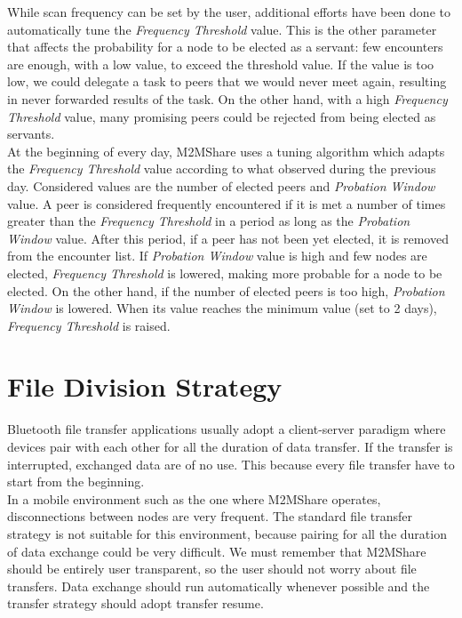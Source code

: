 While scan frequency can be set by the user, additional efforts have been done to automatically tune the \textit{Frequency Threshold} value. This is the other parameter that affects the probability  for a node to be elected as a servant: few encounters are enough, with a low value, to exceed the threshold value. If the value is too low, we could delegate a task to peers that we would never meet again, resulting in never forwarded results of the task. On the other hand, with a high \textit{Frequency Threshold} value, many promising peers could be rejected from being elected as servants.
\\

At the beginning of every day, M2MShare uses a tuning algorithm which adapts the \textit{Frequency Threshold} value according to what observed during the previous day. Considered values are the number of elected peers and \textit{Probation Window} value. A peer is considered frequently encountered if it is met a number of times greater than the \textit{Frequency Threshold} in a period as long as the \textit{Probation Window} value. After this period, if a peer has not been yet elected, it is removed from the encounter list. If \textit{Probation Window} value is high and few nodes are elected, \textit{Frequency Threshold} is lowered, making more probable for a node to be elected. On the other hand, if the number of elected peers is too high, \textit{Probation Window} is lowered. When its value reaches the minimum value (set to 2 days), \textit{Frequency Threshold} is raised.


\section{File Division Strategy}
\label{descrFileDivisionStrategy}
Bluetooth file transfer applications usually adopt a client-server paradigm where devices pair with each other for all the duration of data transfer. If the transfer is interrupted, exchanged data are of no use. This because every file transfer have to start from the beginning. 
\\

In a mobile environment such as the one where M2MShare operates, disconnections between nodes are very frequent. The standard file transfer strategy is not suitable for this environment, because pairing for all the duration of data exchange could be very difficult. We must remember that M2MShare should be entirely user transparent, so the user should not worry about file transfers. Data exchange should run automatically whenever possible and the transfer strategy should adopt transfer resume.
\\

